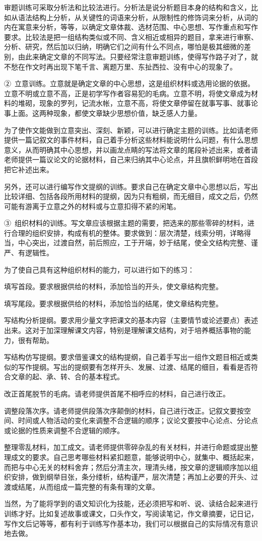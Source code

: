 审题训练可采取分析法和比较法进行。分析法是说分析题目本身的结构和含义，比如从语法结构上分析，从关键性的词语来分析，从限制性的修饰词来分析，从词的内在寓意来分析，等等，以确定文章体裁、选材范围、中心思想、写作重点和写作要求。比较法是把一组结构类似或不同、含义相近或相异的题目，拿来进行审察、分析、研究，然后加以归纳，明确它们之间有什么不同点，哪怕是极其细微的差别，由此来确定文章的不同写法。只要经常注意审题训练，使得写作路子对了，就不愁在作文时再出现下笔千言、离题万里、东扯西拉、没有中心的现象了。

②\ 立意训练。立意就是确定文章的中心思想，这是组织材料或选用论据的依据。立意不明或立意不高，正是初学写作者容易犯的毛病。立意不明，将使文章成为材料的堆砌，现象的罗列，记流水帐，立意不高，将使文章停留在就事写事、就事论事上面。这两种现象，都使文章缺少思想价值，缺乏感人力量。

为了使作文能做到立意突出、深刻、新颖，可以进行确定主题的训练。比如请老师提供一篇记叙文的事件材料，自己着手分析这些材料能说明什么问题，有什么思想意义，从而明确其中心思想，并以画龙点睛的写法将文章的尾段补述出来，或者请老师提供一篇议论文的论据材料，自己来归纳其中心论点，并且旗帜鲜明地在首段把它补述出来。

另外，还可以进行编写作文提纲的训练。要求自己在确定文章中心思想以后，写出比较详细、包括各段所用材料的提纲，因为只有粗纲，而无细目，成文之后，仍然可能有游离于立意之外的材料或与立意扣得不紧的闲笔。

③\ 组织材料的训练。写文章应该根据主题的需要，把选来的那些零碎的材料，进行合理的组织安排，构成有机的整体。要求做到：层次清楚，线索分明，详略得当，中心突出，过渡自然，前后照应，工于开端，妙于结尾，使全文结构完整、谨严、有逻辑性。

为了使自己具有这种组织材料的能力，可以进行如下的练习：

填写首段。要求根据供给的材料，添加恰当的开头，使文章结构完整。

填写尾段。要求根据供给的材料，添加恰当的结尾，使文章结构完整。

写结构分析提纲。要求用少量文字把课文的基本内容（主要情节或论述要点）表述出来。这对于加深理解课文内容，特别是理解课文结构，对于培养概括事物的能力，很有帮助。

写结构仿写提纲。要求借鉴课文的结构提纲，自己着手写出一组作文题目相近或类似的写作提纲。写出的提纲要有怎样开头、发展、过渡、结尾的细目，看看是否符合文章的起、承、转、合的基本程式。

改正首尾脱节的毛病。请老师提供首尾不相呼应的材料，自己进行改正。

调整段落次序。请老师提供段落次序颠倒的材料，自己进行改正。记叙文要按空间、时间或人物活动的变化来调整不合逻辑的顺序；议论文要按中心论点、分论点或论据的性质来调整不合逻辑的顺序。

整理零乱材料，加工成文。请老师提供零碎杂乱的有关材料，并进行命题或提出整理成文的要求。自己思考哪些材料紧扣题意，能够说明中心，就集中、概括起来，而把与中心无关的材料舍弃；然后分清主次，理清头绪，按文章的逻辑顺序加以组织安排，做到纲举目张，条分缕析，结构谨严，层次清楚；再加上必要的开头、过渡或结尾，从而组成一篇完整的有条有理的文章。

当然，为了能将学到的语文知识化为技能，还必须把写和听、说、读结合起来进行训练才好。比如复述故事或课文，口头作文，写阅读笔记，作文章摘要，记日记，写作文后记等等，都有利于训练写作基本功，我们可以根据自己的实际情况有意识地去做。
\newpage